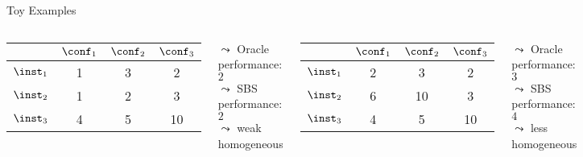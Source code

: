 \begin{frame}[c]{Toy Examples}

\begin{columns}

\begin{center}
\begin{tabular}{l|ccc}
& $\conf_1$ & $\conf_2$ & $\conf_3$\\
\midrule
$\inst_1$ & 1 & 3 & 2 \\
$\inst_2$ & 1 & 2 & 3 \\
$\inst_3$ & 4 & 5 & 10 \\ 
\end{tabular}
\end{center}

\bigskip
\pause
$\leadsto$ Oracle performance: $2$\\
$\leadsto$ SBS performance: $2$\\
$\leadsto$ weak homogeneous 

\pause
{}
\begin{center}
\begin{tabular}{l|ccc}
& $\conf_1$ & $\conf_2$ & $\conf_3$\\
\midrule
$\inst_1$ & 2 & 3 & 2 \\
$\inst_2$ & 6 & 10 & 3 \\
$\inst_3$ & 4 & 5 & 10 \\ 
\end{tabular}
\end{center}

\bigskip
\pause
$\leadsto$ Oracle performance: $3$\\
$\leadsto$ SBS performance: $4$ \\
$\leadsto$ less homogeneous

\end{columns}


\end{frame}
